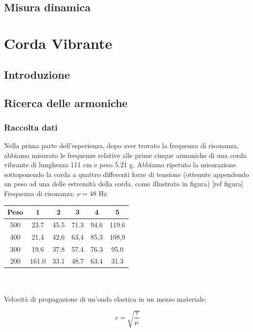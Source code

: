 \documentclass[a4paper,10pt]{report}
\begin{document}
\section{Misura dinamica}

\chapter{Corda Vibrante}

\section{Introduzione}

\section{Ricerca delle armoniche}

\subsection{Raccolta dati}

Nella prima parte dell'esperienza, dopo aver trovato la frequenza di risonanza, abbiamo misurato le frequenze relative alle prime cinque armoniche di una corda vibrante di lunghezza 111 cm e peso 5.21 g. Abbiamo ripetuto la misurazione sottoponendo la corda a quattro differenti forze di tensione (ottenute appendendo un peso ad una delle estremità della corda, come illustrato in figura)
[ref figura]\\

Frequenza di risonanza: $\nu= 48$ Hz\\

\begin{tabular}{ c | c | c | c | c | c }
Peso & 1 & 2 & 3 & 4 & 5\\
\midrule
500 & 23.7 & 45.5 & 71.3 & 94.6 & 119.6\\
400 & 21,4 & 42,6 & 63,4 & 85,3 & 108,9\\
300 & 19.6 & 37.8 & 57.4 & 76.3 & 95.0\\
200 & 161.0 & 33.1 & 48.7 & 63.4 & 31.3 \\
\end{tabular}\\
\\


Velocità di propagazione di un'onda elastica in un mezzo materiale:

\begin{equation}
v=\sqrt{\frac{\tau}{\mu}}
\end{equation}
\end{document}
